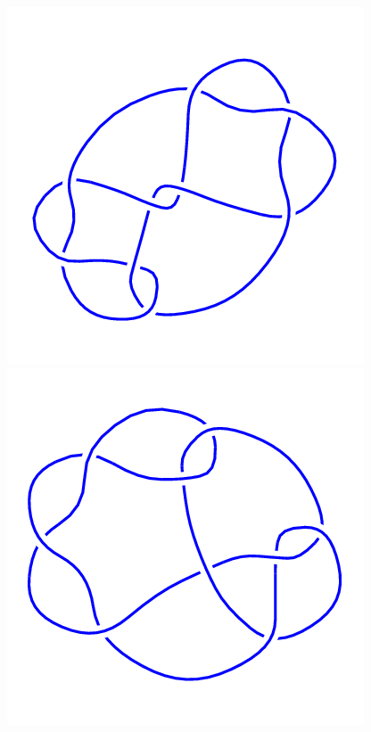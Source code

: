 \begin{figure}[H]
\begin{minipage}[b]{.18\linewidth}
    \end{minipage}
    \begin{minipage}[b]{.18\linewidth}
        \centering
        \includegraphics[width=\linewidth]{../data/9_18.png}
    \end{minipage}
    \begin{minipage}[b]{.18\linewidth}
        \centering
        \includegraphics[width=\linewidth]{../data/9_19.png}

\end{minipage}
\end{figure}
